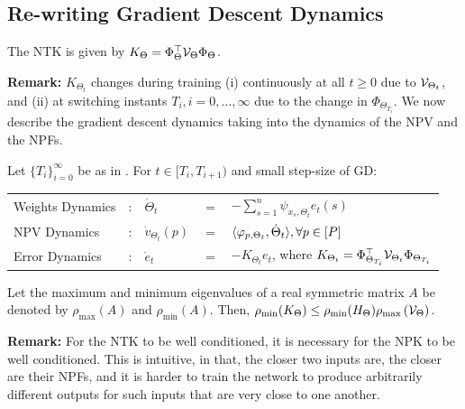 \documentclass{article}
\begin{document}
\subsection{Re-writing Gradient Descent Dynamics}
\begin{proposition}\label{prop:ntknew}
The NTK is given by $K_{\Theta}=\Phi^\top_{\Theta}\mathcal{V}_{\Theta}\Phi_{\Theta}$.
\end{proposition}
\textbf{Remark:} $K_{\Theta_t}$ changes during training (i) continuously at all $t\geq 0$ due to $\mathcal{V}_{\Theta_t}$, and (ii) at switching instants $T_{i},i=0,\ldots,\infty$ due to the change in $\Phi_{\Theta_{T_i}}$. We now describe the gradient descent dynamics taking into the dynamics of the NPV and the NPFs.
\begin{proposition}\label{prop:dnnhard}
Let $\{T_i\}_{i=0}^\infty$ be as in . For $t\in[T_{i},T_{i+1})$ and small step-size of GD:
\FloatBarrier
\begin{table}[h]
\centering
\begin{tabular}{ l c l l l }
Weights Dynamics &:  & $\dot{\Theta}_t$&$=$&$-\sum_{s=1}^n \psi_{x_s,\Theta_t}e_t(s)$\\
NPV Dynamics&: & $\dot{v}_{\Theta_t}(p)$&$=$&$\langle \varphi_{p,\Theta_t},\dot{\Theta}_t\rangle,\forall p\in[P]$\\
Error Dynamics&: & $\dot{e}_t$&$=$&$-K_{\Theta_t}e_t$, where $K_{\Theta_t}=\Phi^\top_{\Theta_{T_i}}\mathcal{V}_{\Theta_t}\Phi_{\Theta_{T_i}}$\\
\end{tabular}
\end{table}
\end{proposition}
\begin{proposition}\label{prop:condition}
Let the maximum and minimum eigenvalues of a real symmetric matrix $A$ be denoted by $\rho_{\max}(A)$ and $\rho_{\min}(A)$. Then, $\rho_{\min}(K_{\Theta})\leq \rho_{\min}(H_{\Theta})\rho_{\max}\left(\mathcal{V}_{\Theta}\right)$.
\end{proposition}
\textbf{Remark:} For the NTK to be well conditioned, it is necessary for the NPK to be well conditioned. This is intuitive, in that, the closer two inputs are, the closer are their NPFs, and it is harder to train the network to produce arbitrarily different outputs for such inputs that are very close to one another.
\end{document}
